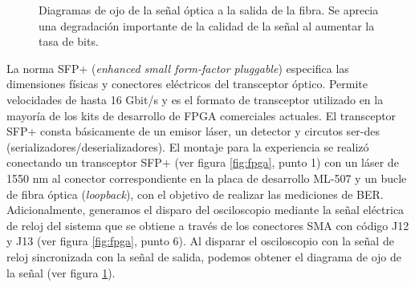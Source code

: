 \begin{figure}[!t]
   \centering
   \qquad
   \qquad
  \caption {Diagramas de ojo de la señal óptica a la salida de la fibra. Se aprecia una degradación importante de la calidad de la señal al aumentar la tasa de bits.}
  \label{fig:ImgOjo}
\end{figure}


La norma SFP+ \cite{sff4sff} (\textit{enhanced small form-factor pluggable}) especifica las dimensiones físicas y conectores eléctricos del transceptor óptico. Permite velocidades de hasta 16 Gbit/s y es el formato de transceptor utilizado en la mayoría de los kits de desarrollo de FPGA comerciales actuales.
El transceptor SFP+ consta básicamente de un emisor láser, un detector y circutos ser-des (serializadores/deserializadores).
El montaje para la experiencia se realizó conectando un transceptor SFP+ (ver figura \ref{fig:fpga}, punto 1) con un láser de 1550 nm 
al conector correspondiente en la placa de desarrollo ML-507 y un bucle de
fibra óptica ({\em loopback}), con el objetivo de realizar las mediciones de BER. Adicionalmente, generamos el disparo del
osciloscopio mediante la señal eléctrica de reloj del sistema que
se obtiene a través de los conectores SMA con código J12 y J13 (ver figura \ref{fig:fpga}, punto 6).  
Al disparar el osciloscopio con la señal de reloj sincronizada con la señal de salida, podemos obtener el diagrama de ojo de la señal (ver figura \ref{fig:ImgOjo}).

